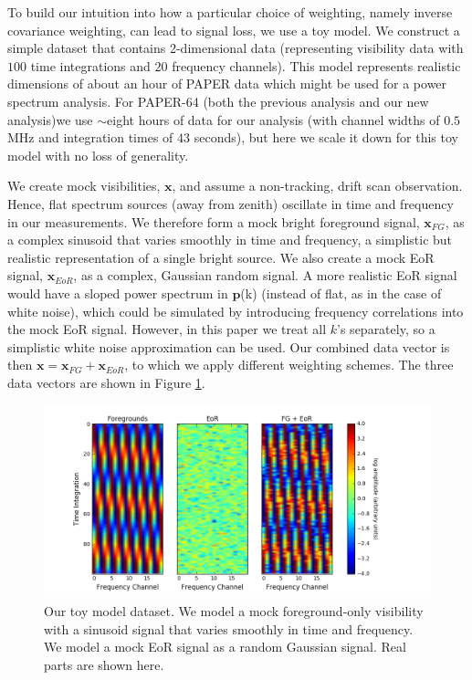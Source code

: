 \documentclass[preprint2,numberedappendix,tighten]{aastex6}  %
\begin{document}
To build our intuition into how a particular choice of weighting, namely inverse covariance weighting, can lead to signal loss, we 
use a toy model. We construct a simple dataset that contains 2-dimensional data (representing visibility data with $100$ time 
integrations and $20$ frequency channels). This model represents realistic dimensions of about an hour of PAPER data which 
might be used for a power spectrum analysis. For PAPER-64 (both the previous analysis and our new analysis)we use $\sim$eight hours of data for our analysis (with channel 
widths of $0.5$ MHz and integration times of $43$ seconds), but here we scale it down for this toy model with no loss of 
generality. 

We create mock visibilities, $\textbf{x}$, and assume a non-tracking, drift scan observation. Hence, flat spectrum sources (away 
from zenith) oscillate in time and frequency in our measurements. We therefore form a mock bright foreground signal, $
\textbf{x}_{FG}$, as a complex sinusoid that varies smoothly in time and frequency, a simplistic but realistic representation of a 
single bright source. We also create a mock EoR signal, $\textbf{x}_{EoR}$, as a complex, Gaussian random signal. A more 
realistic EoR signal would have a sloped power spectrum in $\textbf{p}$(k) (instead of flat, as in the case of white noise), 
which could be simulated by introducing frequency correlations into the mock EoR signal. However, in this paper we treat all 
$k$'s separately, so a simplistic white noise approximation can be used. Our combined data vector is then $\textbf{x} = 
\textbf{x}_{FG} + \textbf{x}_{EoR}$, to which we apply different weighting schemes. The three data vectors are shown in Figure 
\ref{fig:toy_sigloss1}. 

\begin{figure}
	\centering
	\includegraphics[trim={1.5cm 0.2cm 3.5cm 0.3cm},clip,width=\columnwidth]{plots/toy_sigloss1.png}
	\caption{Our toy model dataset. We model a mock foreground-only visibility with a sinusoid signal that varies smoothly in 
time and frequency. We model a mock EoR signal as a random Gaussian signal. Real parts are shown here.}
	\label{fig:toy_sigloss1}
\end{figure}
\end{document}

